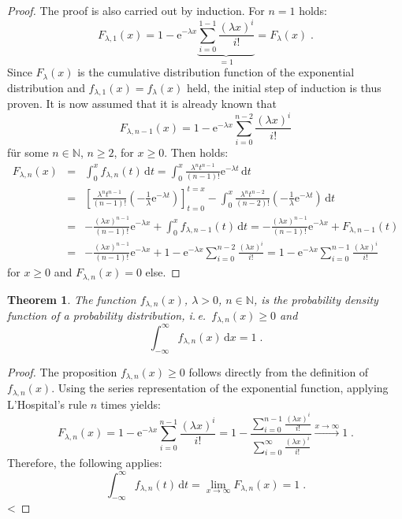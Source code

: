 \documentclass[a4paper,11pt,oneside]{article}
\newtheorem{theorem}{Theorem}
\theoremstyle{definition}
\begin{document}
\begin{proof}
The proof is also carried out by induction. For $n=1$ holds:
$$
F_{\lambda,1}(x)=1-\mathrm{e}^{-\lambda x}\underbrace{\sum_{i=0}^{1-1}\frac{(\lambda x)^i}{i!}}_{=1}=F_{\lambda}(x)\;.
$$
Since $F_{\lambda}(x)$ is the cumulative distribution function of the exponential distribution and $f_{\lambda,1}(x)=f_\lambda(x)$ held, the initial step of induction is thus proven. It is now assumed that it is already known that
$$
F_{\lambda,n-1}(x)=1-\mathrm{e}^{-\lambda x}\sum_{i=0}^{n-2}\frac{(\lambda x)^i}{i!}
$$
für some $n\in\mathbb{N}$, $n\ge2$, for $x\ge0$. Then holds:
\begin{eqnarray*}
F_{\lambda,n}(x)&=&
\int_0^x f_{\lambda,n}(t)\,\mbox{d}t=
\int_0^x \frac{\lambda^n t^{n-1}}{(n-1)!}\mathrm{e}^{-\lambda t}\,\mbox{d}t\\&=&
\left[\frac{\lambda^n t^{n-1}}{(n-1)!}\left(-\frac{1}{\lambda}\mathrm{e}^{-\lambda t}\right)\right]_{t=0}^{t=x}-\int_0^x\frac{\lambda^n t^{n-2}}{(n-2)!}\left(-\frac{1}{\lambda}\mathrm{e}^{-\lambda t}\right)\,\mbox{d}t\\&=&
-\frac{(\lambda x)^{n-1}}{(n-1)!}\mathrm{e}^{-\lambda x}+\int_0^x f_{\lambda,n-1}(t)\,\mbox{d}t=
-\frac{(\lambda x)^{n-1}}{(n-1)!}\mathrm{e}^{-\lambda x}+F_{\lambda,n-1}(t)\\&=&
-\frac{(\lambda x)^{n-1}}{(n-1)!}\mathrm{e}^{-\lambda x}+1-\mathrm{e}^{-\lambda x}\sum_{i=0}^{n-2}\frac{(\lambda x)^i}{i!}=
1-\mathrm{e}^{-\lambda x}\sum_{i=0}^{n-1}\frac{(\lambda x)^i}{i!}
\end{eqnarray*}
for $x\ge0$ and $F_{\lambda,n}(x)=0$ else.
\end{proof}

\begin{theorem}
The function $f_{\lambda,n}(x)$, $\lambda>0$, $n\in\mathbb{N}$, is the probability density function of a probability distribution, i.\,e.\ $f_{\lambda,n}(x)\ge0$ and
$$
\int_{-\infty}^\infty f_{\lambda,n}(x)\,\mbox{d}x=1\;.
$$
\end{theorem}

\begin{proof}
The proposition $f_{\lambda,n}(x)\ge0$ follows directly from the definition of $f_{\lambda,n}(x)$. Using the series representation of the exponential function, applying L'Hospital's rule $n$ times yields:
$$
F_{\lambda,n}(x)=
1-\mathrm{e}^{-\lambda x}\sum_{i=0}^{n-1}\frac{(\lambda x)^i}{i!}=
1-\frac{\sum_{i=0}^{n-1}\frac{(\lambda x)^i}{i!}}{\sum_{i=0}^{\infty}\frac{(\lambda x)^i}{i!}}
\mathop{\longrightarrow}\limits^{x\to\infty}1\;.
$$
Therefore, the following applies:
$$
\int_{-\infty}^\infty f_{\lambda,n}(t)\,\mbox{d}t=
\lim_{x\to\infty}F_{\lambda,n}(x)=1\;.
$$<
\end{proof}
\end{document}
